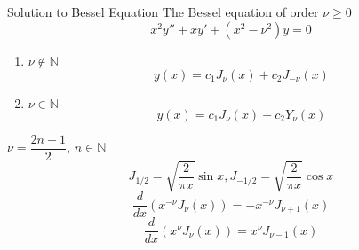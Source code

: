 \documentclass{beamer}
\begin{document}
\begin{frame}
\begin{block}{Solution to Bessel Equation}
The Bessel equation of order $ \nu\geqslant0$
$$x^2y''+xy'+(x^2-\nu^2)y=0$$
\begin{enumerate}
\item $\nu\notin\mathbb{N}$
$$y(x)=c_1J_{\nu}(x)+c_2J_{-\nu}(x)$$
\item $\nu\in\mathbb{N}$
$$y(x)=c_1J_{\nu}(x)+c_2Y_{\nu}(x)$$
\end{enumerate}
\end{block}
\end{frame}

\begin{frame}
\begin{block}{$\nu=\dfrac{2n+1}{2}$, $n\in\mathbb{N}$}
$$J_{1/2}=\sqrt{\dfrac{2}{\pi x}}\sin x,J_{-1/2}=\sqrt{\dfrac{2}{\pi x}}\cos x$$
$$\dfrac{d}{dx}(x^{-\nu}J_{\nu}(x))= -x^{-\nu}J_{\nu+1}(x)$$
$$\dfrac{d}{dx}(x^{\nu}J_{\nu}(x))= x^{\nu}J_{\nu-1}(x)$$
\end{block}
\end{frame}
\end{document}
